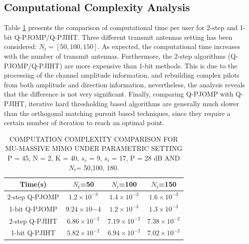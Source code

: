 \subsection{ Computational Complexity Analysis}
Table \ref{tab:comp_time} presents the comparison of computational time per user for 2-step and 1-bit Q-PJOMP/Q-PJIHT. Three different transmit antennas setting has been considered: $N_t=[50, 100, 150]$. 
As expected, the computational time increases with the number of transmit antennas. Furthermore, the 2-step algorithms (Q-PJOMP/Q-PJIHT) are more expensive than 1-bit methods. This is due to the processing of the channel amplitude information, and rebuilding complex pilots from both amplitude and direction information, nevertheless, the analysis reveals that the difference is not very significant. 
Finally, comparing Q-PJOMP with Q-PJIHT, iterative hard thresholding based algorithms are generally much slower than the orthogonal matching pursuit based techniques, since they require a certain number of iteration to reach an optimal point.   
\begin{table}[h!]
    \caption{ COMPUTATION COMPLEXITY COMPARISON FOR MU-MASSIVE MIMO UNDER PARAMETRIC SETTING  P = 45, N = 2, K = 40, $s_c$ = 9, $s_i$ = 17, P = 28 dB AND $N_t$= 50,100, 180. }
\label{tab:comp_time}
\centering
 \begin{tabular}{||c |c |c |c ||} 
 \hline
Time(s)&$N_t$=50&$N_t$=100&$N_t$=150\\ [0.9ex] 
 \hline\hline
 2-step Q-PJOMP&$1.2 \times10^{-3}$&$1.4 \times10^{-3}$ & $1.6 \times10^{-3}$ \\ [0.9ex]
 \hline
 1-bit Q-PJOMP& $9.24\times10{-4}$&$1.2 \times10^{-3}$& $1.3\times10^{-3}$ \\[0.9ex]
 \hline
 2-step Q-PJIHT& $6.86\times10^{-2 }$& $7.19\times10^{-2 }$&$7.38\times10^{-2 }$  \\[0.9ex]
 \hline
 1-bit Q-PJIHT&$5.82\times10^{-2 }$& $6.94\times10^{-2 }$&$7.02\times10^{-2 }$ \\[1ex] 
 \hline
\end{tabular}
\end{table}

